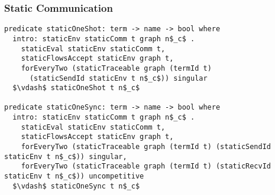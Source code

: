 \documentclass{beamer}
\begin{document}


\begin{frame}[fragile]
	\frametitle{Static Communication}
\begin{lstlisting}[language=logic, mathescape]
predicate staticOneShot: term -> name -> bool where
  intro: staticEnv staticComm t graph n$_c$ .
    staticEval staticEnv staticComm t,
    staticFlowsAccept staticEnv graph t,
    forEveryTwo (staticTraceable graph (termId t)
      (staticSendId staticEnv t n$_c$)) singular
  $\vdash$ staticOneShot t n$_c$

predicate staticOneSync: term -> name -> bool where
  intro: staticEnv staticComm t graph n$_c$ .
    staticEval staticEnv staticComm t,
    staticFlowsAccept staticEnv graph t,
    forEveryTwo (staticTraceable graph (termId t) (staticSendId staticEnv t n$_c$)) singular,
    forEveryTwo (staticTraceable graph (termId t) (staticRecvId staticEnv t n$_c$)) uncompetitive
  $\vdash$ staticOneSync t n$_c$
\end{lstlisting}
\end{frame}
\end{document}
